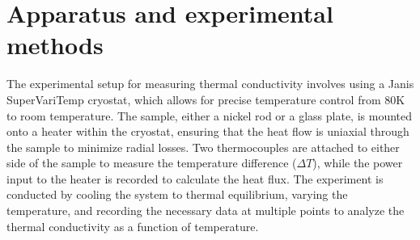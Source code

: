 \documentclass[a4paper,12pt]{article}
\begin{document}
\section{Apparatus and experimental methods}
\label{sec:procedure}
The experimental setup for measuring thermal conductivity involves using a Janis SuperVariTemp cryostat, which allows for precise temperature control from 80\si{\kelvin} to room temperature. The sample, either a nickel rod or a glass plate, is mounted onto a heater within the cryostat, ensuring that the heat flow is uniaxial through the sample to minimize radial losses. Two thermocouples are attached to either side of the sample to measure the temperature difference ($\Delta T$), while the power input to the heater is recorded to calculate the heat flux. The experiment is conducted by cooling the system to thermal equilibrium, varying the temperature, and recording the necessary data at multiple points to analyze the thermal conductivity as a function of temperature.
\end{document}
